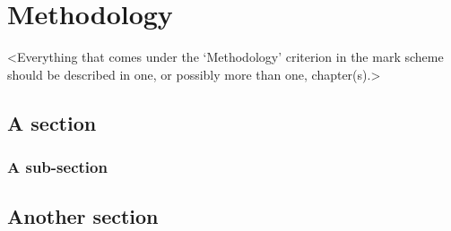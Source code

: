 \chapter{Methodology}
\label{chapter2}

<Everything that comes under the `Methodology' criterion in the mark scheme should be described in one, or possibly more than one, chapter(s).>

\section{A section}
\lipsum[5]

\subsection{A sub-section}
\lipsum[6]

\section{Another section}
\lipsum[7]
